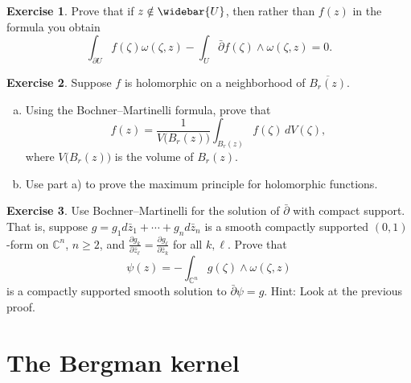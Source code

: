 \documentclass[12pt,openany]{book}
\newcommand{\C}{{\mathbb{C}}}
\theoremstyle{plain}
\theoremstyle{remark}
\theoremstyle{definition}
\newenvironment{exbox}{%
    \def\FrameCommand{\vrule width 1pt \relax\hspace{10pt}}%
    \MakeFramed {\advance \hsize -\width \FrameRestore}%
}{%
    \endMakeFramed
}
\newenvironment{exparts}{%
    \leavevmode\begin{enumerate}[a),noitemsep,topsep=0pt,parsep=0pt,partopsep=0pt]
}{%
    \end{enumerate}
}
\theoremstyle{exercise}
\newtheorem{exercise}{Exercise}[section]
\theoremstyle{example}
\begin{document}
\begin{exbox}
\begin{exercise}
Prove that if $z \notin \widebar{U}$, then rather than $f(z)$ in the
formula you obtain
\begin{equation*}
\int_{\partial U}
f(\zeta) \omega(\zeta,z)
-
\int_{U}
\bar{\partial} f(\zeta) \wedge \omega(\zeta,z) = 0 .
\end{equation*}
\end{exercise}

\begin{exercise}
Suppose $f$ is holomorphic on a neighborhood of
$\overline{B_r(z)}$.
\begin{exparts}
\item
Using the Bochner--Martinelli formula, prove that
\begin{equation*}
f(z) = \frac{1}{V\bigl(B_r(z)\bigr)} \int_{B_r(z)} f(\zeta) \, dV(\zeta) ,
\end{equation*}
where $V\bigl(B_r(z)\bigr)$ is the volume of $B_r(z)$.
\item
Use part a) to prove the maximum principle for holomorphic functions.
\end{exparts}
\end{exercise}

\begin{exercise}
Use Bochner--Martinelli for the solution of $\bar{\partial}$ with compact
support.  That is, suppose $g = g_1 d\bar{z}_1 + \cdots + g_n d\bar{z}_n$
is a smooth compactly supported $(0,1)$-form
on $\C^n$, $n \geq 2$, and
$\frac{\partial g_k}{\partial \bar{z}_\ell} =
\frac{\partial g_\ell}{\partial \bar{z}_k}$ for all $k, \ell$.
Prove that
\begin{equation*}
\psi(z) = - \int_{\C^n} g(\zeta) \wedge \omega(\zeta,z)
\end{equation*}
is a compactly supported smooth solution to $\bar{\partial} \psi = g$.
Hint: Look at the previous proof.
\end{exercise}
\end{exbox}


\section{The Bergman kernel}
\end{document}
